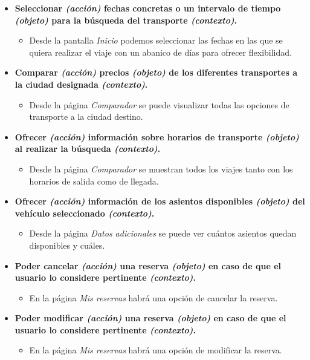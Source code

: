 \begin{itemize}
    \item \textbf{Seleccionar \textit{(acción)} fechas concretas o un intervalo de tiempo \textit{(objeto)} para la búsqueda del transporte \textit{(contexto)}.}
        \begin{itemize}
            \item Desde la pantalla \textit{Inicio} podemos seleccionar las fechas en las que se quiera realizar el viaje con un abanico de días para
                ofrecer flexibilidad.
        \end{itemize}
    
    \item \textbf{Comparar \textit{(acción)} precios \textit{(objeto)} de los diferentes transportes a la ciudad designada \textit{(contexto)}.}
        \begin{itemize}
            \item Desde la página \textit{Comparador} se puede visualizar todas las opciones de transporte a la ciudad destino.
        \end{itemize}

    \item \textbf{Ofrecer \textit{(acción)} información sobre horarios de transporte \textit{(objeto)} al realizar la búsqueda \textit{(contexto)}.}
        \begin{itemize}
            \item Desde la página \textit{Comparador} se muestran todos los viajes tanto con los horarios de salida como de llegada.
        \end{itemize}

    \item \textbf{Ofrecer \textit{(acción)} información de los asientos disponibles \textit{(objeto)} del vehículo seleccionado \textit{(contexto)}.}
        \begin{itemize}
            \item Desde la página \textit{Datos adicionales} se puede ver cuántos asientos quedan disponibles y cuáles.
        \end{itemize}

    \item \textbf{Poder cancelar \textit{(acción)} una reserva \textit{(objeto)} en caso de que el usuario lo considere pertinente \textit{(contexto)}.}
        \begin{itemize}
            \item En la página \textit{Mis reservas} habrá una opción de cancelar la reserva.
        \end{itemize}

    \item \textbf{Poder modificar \textit{(acción)} una reserva \textit{(objeto)} en caso de que el usuario lo considere pertinente \textit{(contexto)}.}
        \begin{itemize}
            \item En la página \textit{Mis reservas} habrá una opción de modificar la reserva.
        \end{itemize}
\end{itemize}


